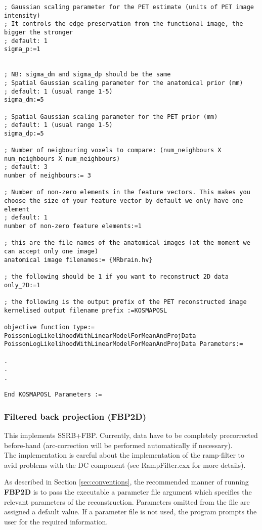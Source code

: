 \documentclass{article}
\begin{document}
{{{\begin{verbatim}
; Gaussian scaling parameter for the PET estimate (units of PET image intensity)
; It controls the edge preservation from the functional image, the bigger the stronger
; default: 1
sigma_p:=1


; NB: sigma_dm and sigma_dp should be the same
; Spatial Gaussian scaling parameter for the anatomical prior (mm)
; default: 1 (usual range 1-5)
sigma_dm:=5

; Spatial Gaussian scaling parameter for the PET prior (mm)
; default: 1 (usual range 1-5)
sigma_dp:=5

; Number of neigbouring voxels to compare: (num_neighbours X num_neighbours X num_neighbours)
; default: 3
number of neighbours:= 3

; Number of non-zero elements in the feature vectors. This makes you choose the size of your feature vector by default we only have one element
; default: 1
number of non-zero feature elements:=1

; this are the file names of the anatomical images (at the moment we can accept only one image)
anatomical image filenames:= {MRbrain.hv}

; the following should be 1 if you want to reconstruct 2D data
only_2D:=1

; the following is the output prefix of the PET reconstructed image
kernelised output filename prefix :=KOSMAPOSL

objective function type:= PoissonLogLikelihoodWithLinearModelForMeanAndProjData
PoissonLogLikelihoodWithLinearModelForMeanAndProjData Parameters:=

.
.
.

End KOSMAPOSL Parameters :=
  \end{verbatim}



\subsubsection{
Filtered back projection (FBP2D)}

This implements SSRB+FBP. Currently, data have to be completely 
precorrected before-hand (arc-correction will be performed automatically
if necessary).\\
The implementation is careful about the implementation of the 
ramp-filter to avid problems with the DC component (see RampFilter.cxx 
for more details).



As described in Section \ref{sec:conventions}, the recommended manner of running \textbf{FBP2D}  
is to pass the executable a parameter file argument which specifies 
the relevant parameters of the reconstruction. Parameters omitted 
from the file are assigned a default value. If a parameter file 
is not used, the program prompts the user for the required information.


}}}
\end{document}
